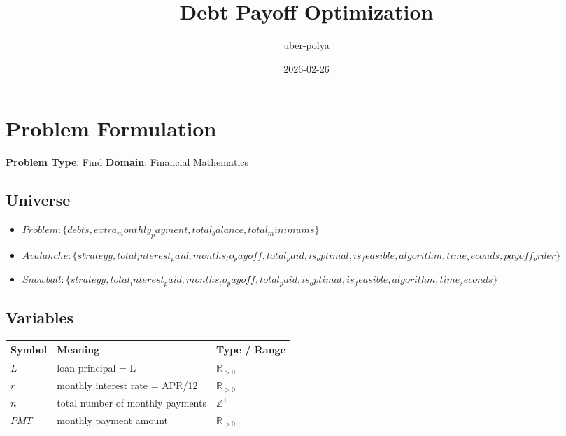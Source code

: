 \documentclass[11pt, a4paper]{article}
\title{Debt Payoff Optimization}
\author{uber-polya}
\date{2026-02-26}
\begin{document}
\maketitle
\tableofcontents
\newpage

\section{Problem Formulation}

\begin{polyamodel}

\textbf{Problem Type}: Find \hfill
\textbf{Domain}: Financial Mathematics


\end{polyamodel}

\subsection{Universe}

\begin{itemize}
  \item $Problem: \{debts, extra_monthly_payment, total_balance, total_minimums\}$
  \item $Avalanche: \{strategy, total_interest_paid, months_to_payoff, total_paid, is_optimal, is_feasible, algorithm, time_seconds, payoff_order\}$
  \item $Snowball: \{strategy, total_interest_paid, months_to_payoff, total_paid, is_optimal, is_feasible, algorithm, time_seconds\}$
\end{itemize}

\subsection{Variables}

\begin{longtable}{lll}
\toprule
\textbf{Symbol} & \textbf{Meaning} & \textbf{Type / Range} \\
\midrule
\endhead
$L$ & loan principal = L & $\mathbb{{R}}_{>0}$ \\
$r$ & monthly interest rate = APR/12 & $\mathbb{{R}}_{>0}$ \\
$n$ & total number of monthly payments & $\mathbb{{Z}}^+$ \\
$PMT$ & monthly payment amount & $\mathbb{{R}}_{>0}$ \\
\bottomrule
\end{longtable}
\end{document}
